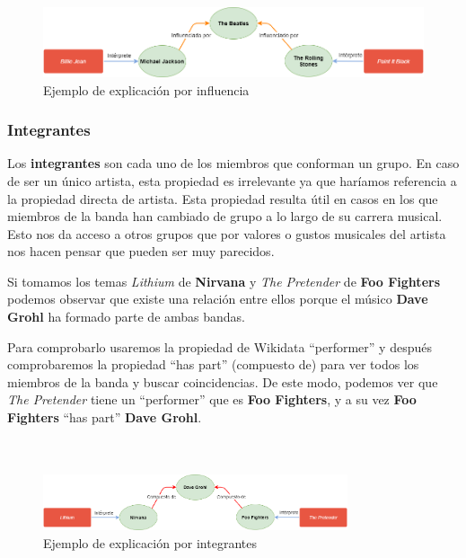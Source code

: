 \begin{figure}[h!]
	\centering
	\includegraphics[width = 1\textwidth]{Imagenes/Bitmap/Influencia ejemplo.png}
	\caption{Ejemplo de explicación por influencia}
	\label{fig:sampleImage}
\end{figure}

\subsubsection*{Integrantes}

Los \textbf{integrantes} son cada uno de los miembros que conforman un grupo. En caso de ser un único artista, esta propiedad es irrelevante ya que haríamos referencia a la propiedad directa de artista. Esta propiedad resulta útil en casos en los que miembros de la banda han cambiado de grupo a lo largo de su carrera musical. Esto nos da acceso a otros grupos que por valores o gustos musicales del artista nos hacen pensar que pueden ser muy parecidos.

Si tomamos los temas \textit{Lithium} de \textbf{Nirvana} y \textit{The Pretender} de \textbf{Foo Fighters} podemos observar que existe una relación entre ellos porque el músico \textbf{Dave Grohl} ha formado parte de ambas bandas.

Para comprobarlo usaremos la propiedad de Wikidata ``performer'' y después comprobaremos la propiedad ``has part'' (compuesto de) para ver todos los miembros de la banda y buscar coincidencias. De este modo, podemos ver que \textit{The Pretender} tiene un ``performer'' que es \textbf{Foo Fighters}, y a su vez \textbf{Foo Fighters} ``has part'' \textbf{Dave Grohl}.\\\\\\

\begin{figure}[h!]
	\centering
	\includegraphics[width = 0.8\textwidth]{Imagenes/Bitmap/Integrante ejemplo.png}
	\caption{Ejemplo de explicación por integrantes}
	\label{fig:sampleImage}
\end{figure}

